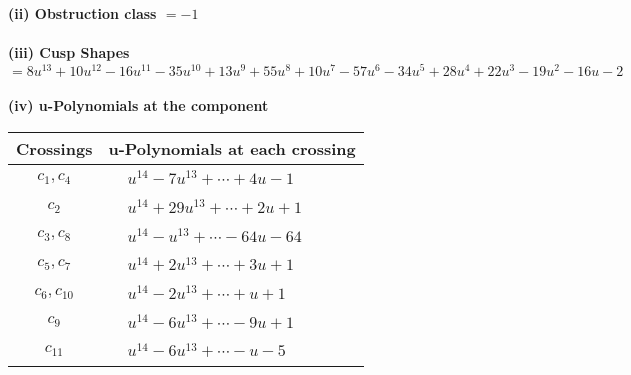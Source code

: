 \documentclass[1p]{elsarticle_modified}
\theoremstyle{definition}
\begin{document}
\flushleft \textbf{(ii) Obstruction class $= -1$}\\~\\
\flushleft \textbf{(iii) Cusp Shapes $= 8 u^{13}+10 u^{12}-16 u^{11}-35 u^{10}+13 u^9+55 u^8+10 u^7-57 u^6-34 u^5+28 u^4+22 u^3-19 u^2-16 u-2$}\\~\\
\newpage\renewcommand{\arraystretch}{1}
\flushleft \textbf{(iv) u-Polynomials at the component}\newline \\
\begin{tabular}{m{50pt}|m{274pt}}
Crossings & \hspace{64pt}u-Polynomials at each crossing \\
\hline $$\begin{aligned}c_{1},c_{4}\end{aligned}$$&$\begin{aligned}
&u^{14}-7 u^{13}+\cdots+4 u-1
\end{aligned}$\\
\hline $$\begin{aligned}c_{2}\end{aligned}$$&$\begin{aligned}
&u^{14}+29 u^{13}+\cdots+2 u+1
\end{aligned}$\\
\hline $$\begin{aligned}c_{3},c_{8}\end{aligned}$$&$\begin{aligned}
&u^{14}- u^{13}+\cdots-64 u-64
\end{aligned}$\\
\hline $$\begin{aligned}c_{5},c_{7}\end{aligned}$$&$\begin{aligned}
&u^{14}+2 u^{13}+\cdots+3 u+1
\end{aligned}$\\
\hline $$\begin{aligned}c_{6},c_{10}\end{aligned}$$&$\begin{aligned}
&u^{14}-2 u^{13}+\cdots+u+1
\end{aligned}$\\
\hline $$\begin{aligned}c_{9}\end{aligned}$$&$\begin{aligned}
&u^{14}-6 u^{13}+\cdots-9 u+1
\end{aligned}$\\
\hline $$\begin{aligned}c_{11}\end{aligned}$$&$\begin{aligned}
&u^{14}-6 u^{13}+\cdots- u-5
\end{aligned}$\\
\hline
\end{tabular}\\~\\
\end{document}
